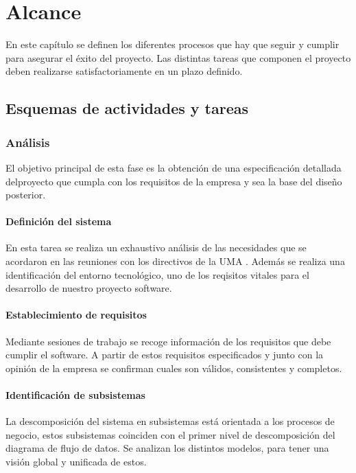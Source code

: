 \documentclass[11pt,a4paper,spanish,twoside]{book}
\begin{document}
\tableofcontents

\chapter{Alcance}
En este capítulo se definen los diferentes procesos que hay que seguir y
cumplir para asegurar el éxito del proyecto. Las distintas tareas que
componen el proyecto deben realizarse satisfactoriamente en un plazo
definido.

\section{Esquemas de actividades y tareas}

\subsection{Análisis}
El objetivo principal de esta fase es la obtención de una especificación
detallada delproyecto que cumpla con los requisitos de la empresa y sea la
base del diseño posterior.

\subsubsection{Definición del sistema}
En esta tarea se realiza un exhaustivo análisis de las necesidades que se
acordaron en las reuniones con los directivos de la UMA . Además se realiza una
identificación del entorno tecnológico, uno de los reqisitos vitales para el
desarrollo de nuestro proyecto software.

\subsubsection{Establecimiento de requisitos}
Mediante sesiones de trabajo se recoge información de los requisitos que debe
cumplir el software. A partir de estos requisitos especificados y junto con la
opinión de la empresa se confirman cuales son válidos, consistentes y 
completos.

\subsubsection{Identificación de subsistemas}
La descomposición del sistema en subsistemas está orientada a los procesos de
negocio, estos subsistemas coinciden con el primer nivel de descomposición
del diagrama de flujo de datos. Se analizan los distintos modelos, para tener
una visión global y unificada de estos.
\end{document}
